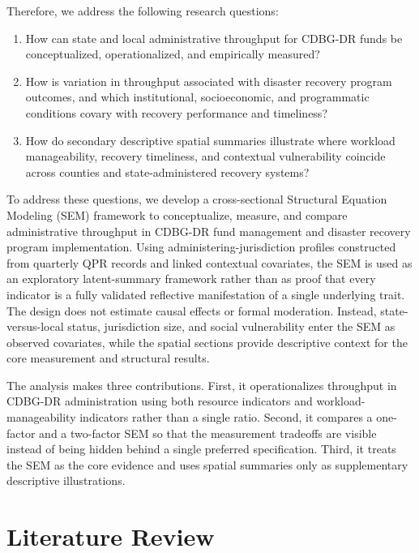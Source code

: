 \documentclass[
  number]{elsarticle}
\providecommand{\tightlist}{%
  \setlength{\itemsep}{0pt}\setlength{\parskip}{0pt}}
\begin{document}
Therefore, we address the following research questions:

\begin{enumerate}
\def\labelenumi{\arabic{enumi}.}
\tightlist
\item
  How can state and local administrative throughput for CDBG-DR funds be
  conceptualized, operationalized, and empirically measured?
\item
  How is variation in throughput associated with disaster recovery
  program outcomes, and which institutional, socioeconomic, and
  programmatic conditions covary with recovery performance and
  timeliness?
\item
  How do secondary descriptive spatial summaries illustrate where
  workload manageability, recovery timeliness, and contextual
  vulnerability coincide across counties and state-administered recovery
  systems?
\end{enumerate}

To address these questions, we develop a cross-sectional Structural
Equation Modeling (SEM) framework to conceptualize, measure, and compare
administrative throughput in CDBG-DR fund management and disaster
recovery program implementation. Using administering-jurisdiction
profiles constructed from quarterly QPR records and linked contextual
covariates, the SEM is used as an exploratory latent-summary framework
rather than as proof that every indicator is a fully validated
reflective manifestation of a single underlying trait. The design does
not estimate causal effects or formal moderation. Instead,
state-versus-local status, jurisdiction size, and social vulnerability
enter the SEM as observed covariates, while the spatial sections provide
descriptive context for the core measurement and structural results.

The analysis makes three contributions. First, it operationalizes
throughput in CDBG-DR administration using both resource indicators and
workload-manageability indicators rather than a single ratio. Second, it
compares a one-factor and a two-factor SEM so that the measurement
tradeoffs are visible instead of being hidden behind a single preferred
specification. Third, it treats the SEM as the core evidence and uses
spatial summaries only as supplementary descriptive illustrations.

\section{Literature Review}\label{literature-review}
\end{document}
